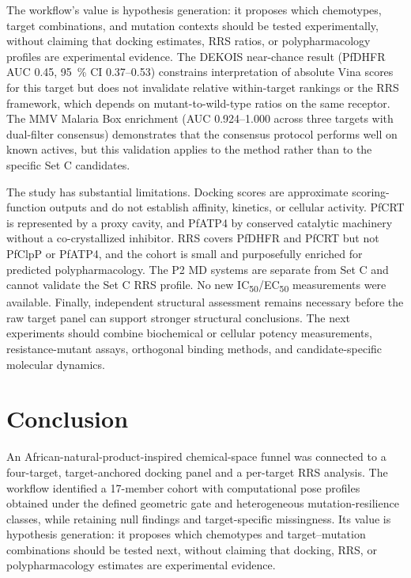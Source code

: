 \documentclass[journal=jcisd8,manuscript=article]{achemso}
\begin{document}
The workflow's value is hypothesis generation: it proposes which chemotypes, target combinations, and mutation contexts should be tested experimentally, without claiming that docking estimates, RRS ratios, or polypharmacology profiles are experimental evidence. The DEKOIS near-chance result (PfDHFR AUC \num{0.45}, \qty{95}{\percent} CI \numrange{0.37}{0.53}) constrains interpretation of absolute Vina scores for this target but does not invalidate relative within-target rankings or the RRS framework, which depends on mutant-to-wild-type ratios on the same receptor. The MMV Malaria Box enrichment (AUC \numrange{0.924}{1.000} across three targets with dual-filter consensus) demonstrates that the consensus protocol performs well on known actives, but this validation applies to the method rather than to the specific Set C candidates.

The study has substantial limitations. Docking scores are approximate scoring-function outputs and do not establish affinity, kinetics, or cellular activity. PfCRT is represented by a proxy cavity, and PfATP4 by conserved catalytic machinery without a co-crystallized inhibitor. RRS covers PfDHFR and PfCRT but not PfClpP or PfATP4, and the cohort is small and purposefully enriched for predicted polypharmacology. The P2 MD systems are separate from Set C and cannot validate the Set C RRS profile. No new IC\textsubscript{50}/EC\textsubscript{50} measurements were available. Finally, independent structural assessment remains necessary before the raw target panel can support stronger structural conclusions. The next experiments should combine biochemical or cellular potency measurements, resistance-mutant assays, orthogonal binding methods, and candidate-specific molecular dynamics.

\section{Conclusion}
An African-natural-product-inspired chemical-space funnel was connected to a four-target, target-anchored docking panel and a per-target RRS analysis. The workflow identified a 17-member cohort with computational pose profiles obtained under the defined geometric gate and heterogeneous mutation-resilience classes, while retaining null findings and target-specific missingness. Its value is hypothesis generation: it proposes which chemotypes and target--mutation combinations should be tested next, without claiming that docking, RRS, or polypharmacology estimates are experimental evidence.
\end{document}
